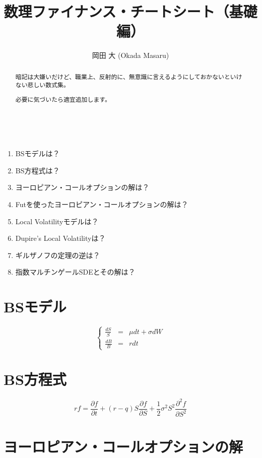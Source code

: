 \documentclass[uplatex]{jsarticle}
\title{
数理ファイナンス・チートシート（基礎編）
}
\author{
岡田 大 (Okada Masaru)
}
\begin{document}
\maketitle

\begin{abstract}
	暗記は大嫌いだけど、職業上、反射的に、無意識に言えるようにしておかないといけない悲しい数式集。

	必要に気づいたら適宜追加します。
\end{abstract}

\ \\

\begin{enumerate}
	\item BSモデルは？
	\item BS方程式は？
	\item ヨーロピアン・コールオプションの解は？
	\item Futを使ったヨーロピアン・コールオプションの解は？
	\item Local Volatilityモデルは？
	\item Dupire's Local Volatilityは？
	\item ギルザノフの定理の逆は？
	\item 指数マルチンゲールSDEとその解は？
\end{enumerate}

\newpage



\section{BSモデル}

\[
	\left\{
	\begin{array}{rcl}
		\displaystyle \frac{dS}{S} & = & \mu dt + \sigma dW \\
		\displaystyle \frac{dB}{B} & = & r dt
	\end{array}
	\right.
\]

\section{BS方程式}

\[
	rf
	=
	\frac{\partial f}{\partial t}
	+
	(r-q) S \frac{\partial f}{\partial S}
	+
	\frac{1}{2} \sigma^{2} S^{2}
	\frac{\partial^{2} f}{\partial S^{2}}
\]


\section{ヨーロピアン・コールオプションの解}
\end{document}

